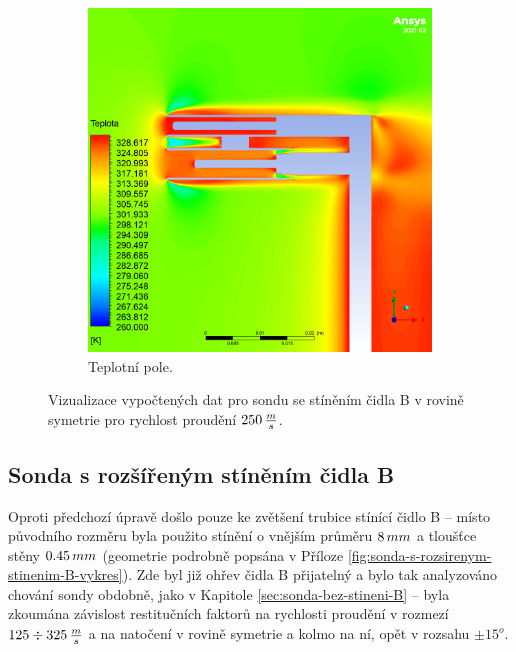 \begin{figure}[ht!]
\begin{subfigure}{0.45\textwidth}
                \includegraphics[width=\textwidth]{400_SIMULACE_KONSTRUKCNICH_UPRAV/Vizualizace/sonda_se_stinenim_B_vizualizace_teplota.png}
                \caption{Teplotní pole.}
            \end{subfigure}
            \caption{Vizualizace vypočtených dat pro sondu se stíněním čidla B v rovině symetrie pro rychlost proudění $250 \, \frac{m}{s}$.}
            \label{fig:sonda-se-stinenim-B-vizualizace}
        \end{figure}
    
    \newpage
    \subsection{Sonda s rozšířeným stíněním čidla B} \label{sec:sonda-s-rozsirenym-stinenim-B}
        Oproti předchozí úpravě došlo pouze ke zvětšení trubice stínící čidlo B – místo původního rozměru byla použito stínění o vnějším průměru $8 \, mm$ a tloušťce stěny $0.45 \, mm$ (geometrie podrobně popsána v Příloze \ref{fig:sonda-s-rozsirenym-stinenim-B-vykres}). Zde byl již ohřev čidla B přijatelný a bylo tak analyzováno chování sondy obdobně, jako v Kapitole \ref{sec:sonda-bez-stineni-B} – byla zkoumána závislost restitučních faktorů na rychlosti proudění v rozmezí $125 \div 325 \, \frac{m}{s}$ a na natočení v rovině symetrie a kolmo na ní, opět v rozsahu $\pm 15^o$.
        
